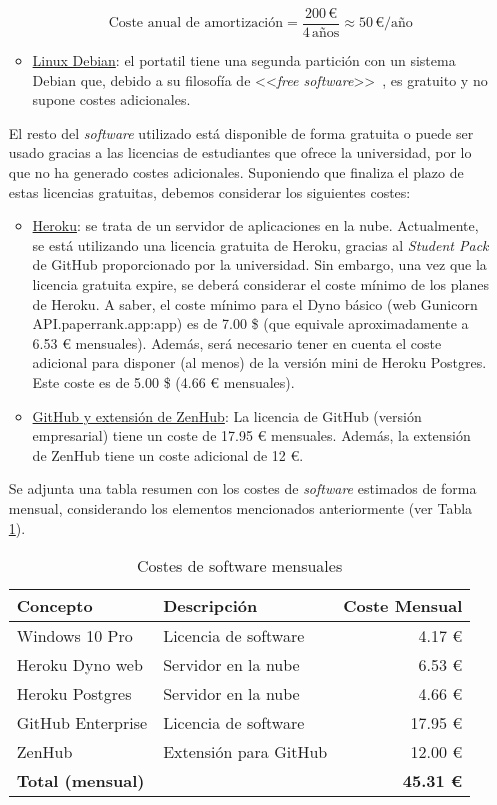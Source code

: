 \begin{enumerate}
\begin{itemize}
        \[
        \text{{Coste anual de amortización}} = \frac{{200 \, \text{{€}}}}{{4 \, \text{{años}}}} \approx 50 \, \text{{€/año}}
        \]

        \item \underline{Linux Debian}: el portatil tiene una segunda partición con un sistema Debian que, debido a su filosofía de <<\textit{free software}>>~\cite{Debian}, es gratuito y no supone costes adicionales.
    \end{itemize}

    El resto del \textit{software} utilizado está disponible de forma gratuita o puede ser usado gracias a las licencias de estudiantes que ofrece la universidad, por lo que no ha generado costes adicionales. Suponiendo que finaliza el plazo de estas licencias gratuitas, debemos considerar los siguientes costes:

    \begin{itemize}
        \item \underline{Heroku}: se trata de un servidor de aplicaciones en la nube. Actualmente, se está utilizando una licencia gratuita de Heroku, gracias al \textit{Student Pack} de GitHub proporcionado por la universidad. Sin embargo, una vez que la licencia gratuita expire, se deberá considerar el coste mínimo de los planes de Heroku. A saber, el coste mínimo para el Dyno básico (web Gunicorn API.paperrank.app:app) es de 7.00 \$ (que equivale aproximadamente a 6.53 € mensuales). Además, será necesario tener en cuenta el coste adicional para disponer (al menos) de la versión mini de Heroku Postgres. Este coste es de 5.00 \$ (4.66 € mensuales).
        \item \underline{GitHub y extensión de ZenHub}: La licencia de GitHub (versión empresarial) tiene un coste de 17.95 € mensuales. Además, la extensión de ZenHub tiene un coste adicional de 12 €.  
    \end{itemize}

    Se adjunta una tabla resumen con los costes de \textit{software} estimados de forma mensual, considerando los elementos mencionados anteriormente (ver Tabla \ref{tab:costes-software}). 

\begin{table}[h]
\centering
\begin{tabularx}{\textwidth}{@{}lXr@{}}
\toprule
\textbf{Concepto} & \textbf{Descripción} & \textbf{Coste Mensual} \\
\midrule
Windows 10 Pro & Licencia de software & 4.17 € \\
Heroku Dyno web & Servidor en la nube & 6.53 € \\
Heroku Postgres & Servidor en la nube & 4.66 € \\
GitHub Enterprise & Licencia de software & 17.95 € \\
ZenHub & Extensión para GitHub & 12.00 € \\
\midrule
\textbf{Total (mensual)} & & \textbf{45.31 €} \\
\bottomrule
\end{tabularx}
\caption{Costes de software mensuales}
\label{tab:costes-software}
\end{table}


\end{enumerate}
